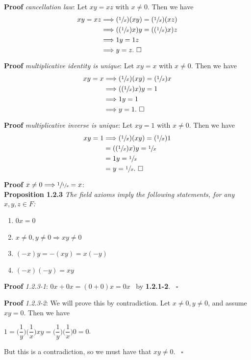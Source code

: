 \documentclass{article}
\begin{document}
\textbf{Proof} \textit{cancellation law}: Let $xy=xz$ with $x \neq 0$. Then we have
\begin{align*}
    xy=xz &\Longrightarrow (\sfrac{1}{x})(xy)=(\sfrac{1}{x})(xz)\\
    &\Longrightarrow ((\sfrac{1}{x})x)y=((\sfrac{1}{x})x)z\\
    &\Longrightarrow 1y=1z\\
    &\Longrightarrow y=z. \ \square
\end{align*}

\textbf{Proof} \textit{multiplicative identity is unique}: Let $xy=x$ with $x \neq 0$. Then we have
\begin{align*}
    xy=x &\Longrightarrow (\sfrac{1}{x})(xy)=(\sfrac{1}{x})x\\
    &\Longrightarrow ((\sfrac{1}{x})x)y=1\\
    &\Longrightarrow 1y=1\\
    &\Longrightarrow y=1. \ \square
\end{align*}

\textbf{Proof} \textit{multiplicative inverse is unique}: Let $xy=1$ with $x \neq 0$. Then we have
\begin{align*}
    xy=1 &\Longrightarrow (\sfrac{1}{x})(xy)=(\sfrac{1}{x})1\\
    &=((\sfrac{1}{x})x)y=\sfrac{1}{x}\\
    &=1y=\sfrac{1}{x}\\
    &=y=\sfrac{1}{x}. \ \square
\end{align*}

\textbf{Proof} \textit{$x \neq 0 \Longrightarrow \sfrac{1}{\sfrac{1}{x}}=x$}:  \\

\textbf{Proposition 1.2.3} \textit{The field axioms imply the following statements, for any $x,y,z \in F$:}
\begin{enumerate}
    \item $0x=0$
    \item $x \neq 0, y \neq 0 \Longrightarrow xy \neq 0$
    \item $(-x)y = -(xy) =x(-y)$
    \item $(-x)(-y)=xy$
\end{enumerate}

\textbf{Proof} \textit{1.2.3-1}: $0x+0x=(0+0)x=0x$ \ by \textbf{1.2.1-2}. \ $\square$

\textbf{Proof} \textit{1.2.3-2}: We will prove this by contradiction. Let $x \neq 0, y \neq 0$, and assume $xy = 0$. Then we have 
\begin{center}
    $1=\biggl(\dfrac{1}{y}\biggr)\biggl(\dfrac{1}{x}\biggr)xy=\biggl(\dfrac{1}{y}\biggr)\biggl(\dfrac{1}{x}\biggr)0=0$.
\end{center}
But this is a contradiction, so we must have that $xy \neq 0$. \ $\square$
\end{document}
